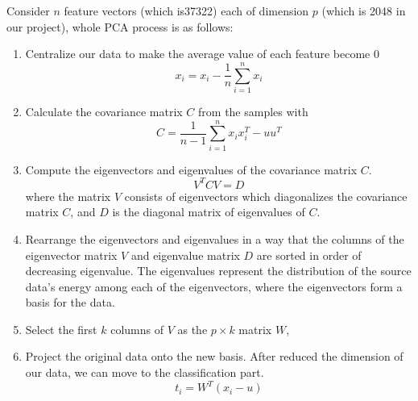 \documentclass{article}
\begin{document}
Consider $n$ feature vectors (which is37322) each of dimension $p$ (which is 2048 in our project), whole PCA process is as follows:
\begin{enumerate}
	\item Centralize our data to make the average value of each feature become 0
	\begin{equation}
	x_i =x_i- \frac{1}{n} \sum_{i=1}^n x_i\label{eq:mean}
	\end{equation}
	
	\item Calculate the covariance matrix $C$ from the samples with
	\begin{equation}
	C = \frac{1}{n-1} \sum_{i=1}^n x_i x_i^T - u u^T \label{eq:cx}
	\end{equation}
	
	\item Compute the eigenvectors and eigenvalues of the covariance matrix $C$.
	\begin{equation}
	V^T CV = D \label{eq:eig}
	\end{equation}
	where the matrix $V$ consists of eigenvectors which diagonalizes the covariance matrix $C$, and $D$ is the diagonal matrix of eigenvalues of $C$.
	
	\item Rearrange the eigenvectors and eigenvalues in a way that the columns of the eigenvector matrix $V$ and eigenvalue matrix $D$ are sorted in order of decreasing eigenvalue. The eigenvalues represent the distribution of the source data's energy among each of the eigenvectors, where the eigenvectors form a basis for the data.
	
	\item Select the first $k$ columns of $V$ as the $p \times k$ matrix $W$, 
	
	\item Project the original data onto the new basis. After reduced the dimension of our data, we can move to the classification part.
	\begin{equation}
	t_i = W^T (x_i - u)\label{eq:proj}
	\end{equation}
	
\end{enumerate}
\end{document}
